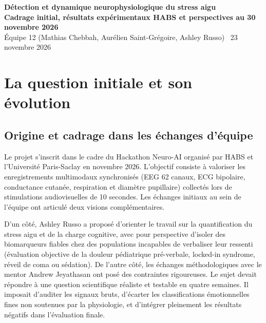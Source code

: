 \documentclass[10pt,a4paper]{article}
\begin{document}
\begin{center}
  {\LARGE\bfseries\color{primary} Détection et dynamique neurophysiologique du stress aigu}\\[3pt]
  {\normalsize\bfseries\color{secondary} Cadrage initial, résultats expérimentaux HABS et perspectives au 30 novembre 2026}\\[3pt]
  {\small Équipe 12 (Mathias Chebbah, Aurélien Saint-Grégoire, Ashley Russo) \textbar\ 23 novembre 2026}
\end{center}

\vspace{-2pt}

\section{La question initiale et son évolution}

\subsection{Origine et cadrage dans les échanges d'équipe}
Le projet s'inscrit dans le cadre du Hackathon Neuro-AI organisé par HABS et l'Université Paris-Saclay en novembre 2026. L'objectif consiste à valoriser les enregistrements multimodaux synchronisés (EEG 62 canaux, ECG bipolaire, conductance cutanée, respiration et diamètre pupillaire) collectés lors de stimulations audiovisuelles de 10 secondes. Les échanges initiaux au sein de l'équipe ont articulé deux visions complémentaires.

D'un côté, Ashley Russo a proposé d'orienter le travail sur la quantification du stress aigu et de la charge cognitive, avec pour perspective d'isoler des biomarqueurs fiables chez des populations incapables de verbaliser leur ressenti (évaluation objective de la douleur pédiatrique pré-verbale, locked-in syndrome, réveil de coma ou sédation). De l'autre côté, les échanges méthodologiques avec le mentor Andrew Jeyathasan ont posé des contraintes rigoureuses. Le sujet devait répondre à une question scientifique réaliste et testable en quatre semaines. Il imposait d'auditer les signaux bruts, d'écarter les classifications émotionnelles fines non soutenues par la physiologie, et d'intégrer pleinement les résultats négatifs dans l'évaluation finale.
\end{document}
